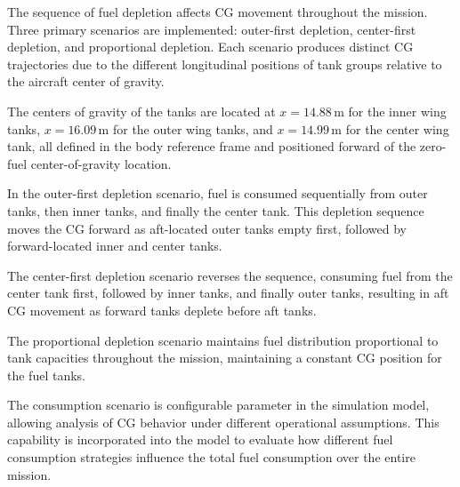 The sequence of fuel depletion affects CG movement throughout the mission. Three primary scenarios are implemented: outer-first depletion, center-first depletion, and proportional depletion. Each scenario produces distinct CG trajectories due to the different longitudinal positions of tank groups relative to the aircraft center of gravity.

The centers of gravity of the tanks are located at \( x = 14.88\,\mathrm{m} \) for the inner wing tanks, \( x = 16.09\,\mathrm{m} \) for the outer wing tanks, and \( x = 14.99\,\mathrm{m} \) for the center wing tank, all defined in the body reference frame and positioned forward of the zero-fuel center-of-gravity location.

In the outer-first depletion scenario, fuel is consumed sequentially from outer tanks, then inner tanks, and finally the center tank. This depletion sequence moves the CG forward as aft-located outer tanks empty first, followed by forward-located inner and center tanks. 

The center-first depletion scenario reverses the sequence, consuming fuel from the center tank first, followed by inner tanks, and finally outer tanks, resulting in aft CG movement as forward tanks deplete before aft tanks.

The proportional depletion scenario maintains fuel distribution proportional to tank capacities throughout the mission, maintaining a constant CG position for the fuel tanks.

The consumption scenario is configurable parameter in the simulation model, allowing analysis of CG behavior under different operational assumptions. This capability is incorporated into the model to evaluate how different fuel consumption strategies influence the total fuel consumption over the entire mission.

